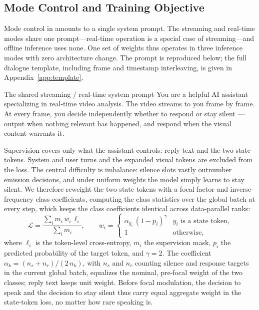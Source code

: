 \subsection{Mode Control and Training Objective}\label{sec:mode-control}

Mode control in \mossvl{} amounts to a single system prompt. The
streaming and real-time modes share one prompt---real-time operation is
a special case of streaming---and offline inference uses none. One set
of weights thus operates in three inference modes with zero architecture
change. The prompt is reproduced below; the full dialogue template,
including frame and timestamp interleaving, is given in
Appendix~\ref{app:template}.

\begin{promptbox}{The shared streaming / real-time system prompt}
You are a helpful AI assistant specializing in real-time video analysis.
The video streams to you frame by frame. At every frame, you decide
independently whether to respond or stay silent --- output
 when nothing relevant has happened, and respond when
the visual content warrants it.
\end{promptbox}

Supervision covers only what the assistant controls: reply text and the
two state tokens. System and user turns and the expanded visual tokens
are excluded from the loss. The central difficulty is imbalance: silence
slots vastly outnumber emission decisions, and under uniform weights the
model simply learns to stay silent. We therefore reweight the two state
tokens with a focal factor and inverse-frequency class coefficients,
computing the class statistics over the global batch at every step,
which keeps the class coefficients identical across data-parallel
ranks:
\begin{equation}\label{eq:realtime-loss}
\mathcal{L}=\frac{\sum_i m_i\, w_i\, \ell_i}{\sum_i m_i},\qquad
w_i=\begin{cases}
\alpha_{y_i}\,(1-p_i)^{\gamma} & \text{$y_i$ is a state token,}\\
1 & \text{otherwise,}
\end{cases}
\end{equation}
where $\ell_i$ is the token-level cross-entropy, $m_i$ the supervision
mask, $p_i$ the predicted probability of the target token, and
$\gamma=2$. The coefficient $\alpha_k=(n_s+n_r)/(2\,n_k)$, with $n_s$ and
$n_r$ counting silence and response targets in the current global batch,
equalizes the nominal, pre-focal weight of the two classes; reply text
keeps unit weight. Before focal modulation, the decision to speak and
the decision to stay silent thus carry equal aggregate weight in the
state-token loss, no matter how rare speaking is.

